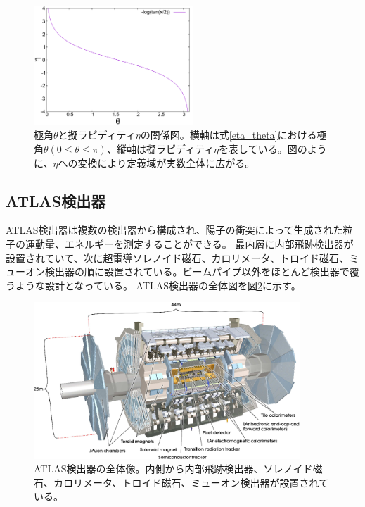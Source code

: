 \begin{figure}[bpt]\centering
\includegraphics[width=6cm]{./data/eta_theta_relation.pdf}
\caption[極角$\theta$と擬ラピディティ$\eta$の関係図]{極角$\theta$と擬ラピディティ$\eta$の関係図。横軸は式\ref{eta_theta}における極角$\theta (0\leq\theta\leq\pi)$、縦軸は擬ラピディティ$\eta$を表している。図のように、$\eta$への変換により定義域が実数全体に広がる。}
\label{eta_theta_graph}
\end{figure}

\subsection{ATLAS検出器}
ATLAS検出器は複数の検出器から構成され、陽子の衝突によって生成された粒子の運動量、エネルギーを測定することができる。
最内層に内部飛跡検出器が設置されていて、次に超電導ソレノイド磁石、カロリメータ、トロイド磁石、ミューオン検出器の順に設置されている。ビームパイプ以外をほとんど検出器で覆うような設計となっている。
ATLAS検出器の全体図を図\ref{atlas_detector}に示す。

\begin{figure}[bpt]\centering
\includegraphics[width=10cm]{./atlas_detector.png}
\caption[ATLAS検出器の全体像]{ATLAS検出器の全体像\cite{1-2}。内側から内部飛跡検出器、ソレノイド磁石、カロリメータ、トロイド磁石、ミューオン検出器が設置されている。}
\label{atlas_detector}
\end{figure}


